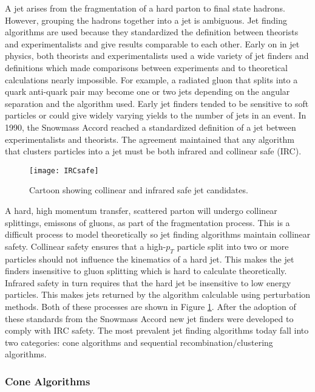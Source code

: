 A jet arises from the fragmentation of a hard parton to final state hadrons.  However, grouping the hadrons together into a jet is ambiguous.  Jet finding algorithms are used because they standardized the definition between theorists and experimentalists and give results comparable to each other. Early on in jet physics, both theorists and experimentalists used a wide variety of jet finders and definitions which made comparisons between experiments and to theoretical calculations nearly impossible\cite{Atkin:2015msa}.  For example, a radiated gluon that splits into a quark anti-quark pair may become one or two jets depending on the angular separation and the algorithm used.  Early jet finders tended to be sensitive to soft particles or could give widely varying yields to the number of jets in an event.  In 1990, the Snowmass Accord\cite{Huth:217490} reached a standardized definition of a jet between experimentalists and theorists.  The agreement maintained that any algorithm that clusters particles into a jet must be both infrared and collinear safe (IRC).  

\begin{figure}[b!]
\texttt{[image: IRCsafe]}
\centering
\caption{Cartoon showing collinear and infrared safe jet candidates\cite{Blazey:2000qt}.}
\label{fig:IRCsafe}
\end{figure}

A hard, high momentum transfer, scattered parton will undergo collinear splittings, emissons of gluons, as part of the fragmentation process.  This is a difficult process to model theoretically so jet finding algorithms maintain collinear safety.
Collinear safety ensures that a high-$p_{T}$ particle split into two or more particles should not influence the kinematics of a hard jet.  This makes the jet finders insensitive to gluon splitting which is hard to calculate theoretically.  Infrared safety in turn requires that the hard jet be insensitive to low energy particles\cite{Salam:2009jx}.  This makes jets returned by the algorithm calculable using perturbation methods.  Both of these processes are shown in Figure \ref{fig:IRCsafe}. After the adoption of these standards from the Snowmass Accord new jet finders were developed to comply with IRC safety.  The most prevalent jet finding algorithms today fall into two categories: cone algorithms and sequential recombination/clustering algorithms.

\subsubsection{Cone Algorithms}

